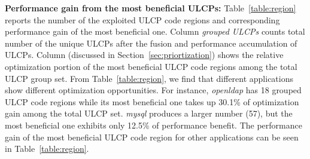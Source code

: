 \textbf{Performance gain from the most beneficial ULCPs:} Table~\ref{table:region} reports the number of the exploited ULCP code regions and corresponding performance gain of the most beneficial one.
Column \emph{grouped ULCPs} counts total number of the unique ULCPs after the fusion and performance accumulation of ULCPs.
Column  (discussed in Section~\ref{sec:priortization}) shows the relative optimization portion of the most beneficial ULCP code regions among the total ULCP group set.
From Table~\ref{table:region}, we find that different applications show different optimization opportunities. For instance, \emph{openldap} has 18 grouped ULCP code regions while its most beneficial one takes up 30.1\% of optimization gain among the total ULCP set. \emph{mysql} produces a larger number (57), but the most beneficial one exhibits only 12.5\% of performance benefit.
The performance gain of the most beneficial ULCP code region for other applications can be seen in Table~\ref{table:region}.



\begin{comment}
\begin{table}[tbp]   \centering
\scriptsize
\tabcolsep=0.06cm
\caption{Number and corresponding overall performance gain of the beneficial ULCPs using K-constraint with  and different  =0.5, 0.15, 0.1, 0.05}
\begin{tabular}{|c|c|c|c|c|c|c|c|c|c|}\hline
\multirow{3}{*}{\textbf{Applications}}&\multicolumn{8}{c|}{\textbf{Choice of }}&\multirow{3}{*}{\minitab[c]{grouped\\ ULCPs}}\\
\cline{2-9}
&\multicolumn{2}{c|}{\textbf{}}&\multicolumn{2}{c|}{\textbf{}}& \multicolumn{2}{c|}{\textbf{}}&\multicolumn{2}{c|}{\textbf{}}& \\ \cline{2-9}
 &k&&k&&k&&k&&\\ \hline \hline

openldap&- &- &\textbf{6} &\textbf{82.7\%} &11 &91.7\% &18 &100\% & 18\\
mysql&\textbf{27} &\textbf{80.1\%} &27 &80.1\% &27 &80.1\% &27 &80.1\% & 57\\ \hline
pbzip2&\textbf{2} &\textbf{85.7\%} &- &- &- &- &- &- &4 \\
transmissionBT&\textbf{2} &\textbf{100\%} &- &- &- &- &- &- & 2\\
handbrake&\textbf{14} &\textbf{80.3\%} &14 &80.3\% &14 &80.3\% &18 &88.2\% &29 \\ \hline
blackscholes&- &- &- &- &- &- &- &- &0 \\
bodytrack&\textbf{4} &\textbf{90.3\%} &- &- &- &- &- &- &5 \\
facesim&\textbf{4} & \textbf{80.1\%}&6 &88.5\% &10 &98.5\% &- &- &11 \\
fluidanimate&\textbf{2} &\textbf{85.6\%} &- &- &- &- &- &- &3 \\
swaptions&- &- &- &- &- &- &- &- &0 \\ \hline
\end{tabular}
\label{table:region}
\end{table}
\end{comment}

